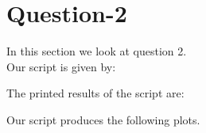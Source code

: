 \section{Question-2}

In this section we look at question 2. \\

Our script is given by:


The printed results of the script are:



Our script produces the following plots.

